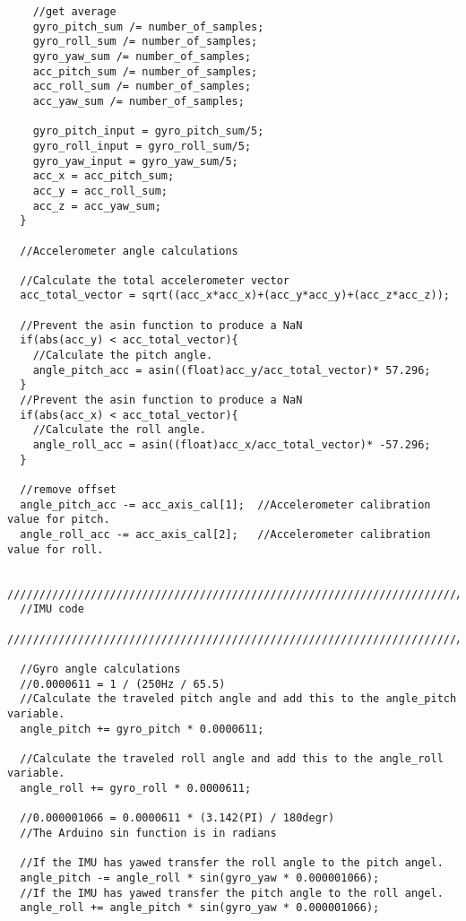 \begin{lstlisting}
    //get average
    gyro_pitch_sum /= number_of_samples;
    gyro_roll_sum /= number_of_samples;
    gyro_yaw_sum /= number_of_samples;
    acc_pitch_sum /= number_of_samples;
    acc_roll_sum /= number_of_samples;
    acc_yaw_sum /= number_of_samples;
    
    gyro_pitch_input = gyro_pitch_sum/5;
    gyro_roll_input = gyro_roll_sum/5;
    gyro_yaw_input = gyro_yaw_sum/5;
    acc_x = acc_pitch_sum;
    acc_y = acc_roll_sum;
    acc_z = acc_yaw_sum;
  }
  
  //Accelerometer angle calculations

  //Calculate the total accelerometer vector
  acc_total_vector = sqrt((acc_x*acc_x)+(acc_y*acc_y)+(acc_z*acc_z));       

  //Prevent the asin function to produce a NaN
  if(abs(acc_y) < acc_total_vector){   
    //Calculate the pitch angle.
    angle_pitch_acc = asin((float)acc_y/acc_total_vector)* 57.296;          
  }
  //Prevent the asin function to produce a NaN
  if(abs(acc_x) < acc_total_vector){
    //Calculate the roll angle.                                       
    angle_roll_acc = asin((float)acc_x/acc_total_vector)* -57.296;          
  }

  //remove offset
  angle_pitch_acc -= acc_axis_cal[1];  //Accelerometer calibration value for pitch.
  angle_roll_acc -= acc_axis_cal[2];   //Accelerometer calibration value for roll.
 
  //////////////////////////////////////////////////////////////////////////////////////
  //IMU code 
  //////////////////////////////////////////////////////////////////////////////////////  

  //Gyro angle calculations
  //0.0000611 = 1 / (250Hz / 65.5)
  //Calculate the traveled pitch angle and add this to the angle_pitch variable.
  angle_pitch += gyro_pitch * 0.0000611;                                    

  //Calculate the traveled roll angle and add this to the angle_roll variable.
  angle_roll += gyro_roll * 0.0000611;                                     

  //0.000001066 = 0.0000611 * (3.142(PI) / 180degr) 
  //The Arduino sin function is in radians
  
  //If the IMU has yawed transfer the roll angle to the pitch angel.
  angle_pitch -= angle_roll * sin(gyro_yaw * 0.000001066);
  //If the IMU has yawed transfer the pitch angle to the roll angel.                  
  angle_roll += angle_pitch * sin(gyro_yaw * 0.000001066);                 
  

\end{lstlisting}
